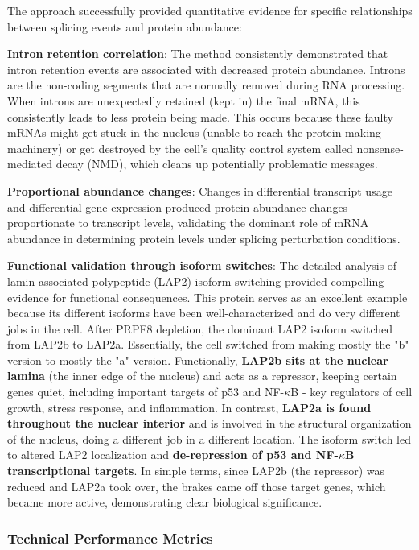 \documentclass[12pt,a4paper]{article}
\begin{document}
The approach successfully provided quantitative evidence for specific relationships between splicing events and protein abundance:

\textbf{Intron retention correlation}: The method consistently demonstrated that intron retention events are associated with decreased protein abundance. Introns are the non-coding segments that are normally removed during RNA processing. When introns are unexpectedly retained (kept in) the final mRNA, this consistently leads to less protein being made. This occurs because these faulty mRNAs might get stuck in the nucleus (unable to reach the protein-making machinery) or get destroyed by the cell's quality control system called nonsense-mediated decay (NMD), which cleans up potentially problematic messages.

\textbf{Proportional abundance changes}: Changes in differential transcript usage and differential gene expression produced protein abundance changes proportionate to transcript levels, validating the dominant role of mRNA abundance in determining protein levels under splicing perturbation conditions.

\textbf{Functional validation through isoform switches}: The detailed analysis of lamin-associated polypeptide (LAP2) isoform switching provided compelling evidence for functional consequences. This protein serves as an excellent example because its different isoforms have been well-characterized and do very different jobs in the cell. After PRPF8 depletion, the dominant LAP2 isoform switched from LAP2b to LAP2a. Essentially, the cell switched from making mostly the "b" version to mostly the "a" version. Functionally, \textbf{LAP2b sits at the nuclear lamina} (the inner edge of the nucleus) and acts as a repressor, keeping certain genes quiet, including important targets of p53 and NF-$\kappa$B - key regulators of cell growth, stress response, and inflammation. In contrast, \textbf{LAP2a is found throughout the nuclear interior} and is involved in the structural organization of the nucleus, doing a different job in a different location. The isoform switch led to altered LAP2 localization and \textbf{de-repression of p53 and NF-$\kappa$B transcriptional targets}. In simple terms, since LAP2b (the repressor) was reduced and LAP2a took over, the brakes came off those target genes, which became more active, demonstrating clear biological significance.

\subsubsection{Technical Performance Metrics}
\end{document}
